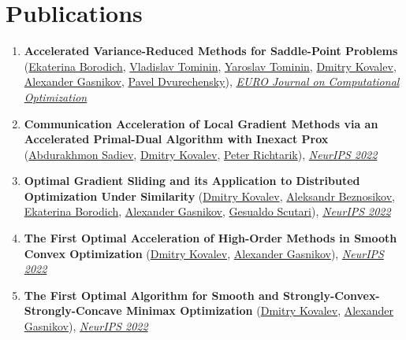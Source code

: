 \section{Publications}
\begin{enumerate}
\item \textbf{Accelerated Variance-Reduced Methods for Saddle-Point Problems} (\href{https://scholar.google.com/citations?user=9Dapoy8AAAAJ}{\color{linkcolour}Ekaterina Borodich}, \href{}{\color{linkcolour}Vladislav Tominin}, \href{}{\color{linkcolour}Yaroslav Tominin}, \href{https://www.dmitry-kovalev.com}{\color{linkcolour}Dmitry Kovalev}, \href{https://scholar.google.ru/citations?user=AmeE8qkAAAAJ}{\color{linkcolour}Alexander Gasnikov}, \href{http://wias-berlin.de/people/dvureche/}{\color{linkcolour}Pavel Dvurechensky}), \href{https://www.sciencedirect.com/science/article/pii/S2192440622000247}{\em \color{black}EURO Journal on Computational Optimization}
\item \textbf{Communication Acceleration of Local Gradient Methods via an Accelerated Primal-Dual Algorithm with Inexact Prox} (\href{https://scholar.google.com/citations?user=R-xZRIAAAAAJ&hl=ru}{\color{linkcolour}Abdurakhmon Sadiev}, \href{https://www.dmitry-kovalev.com}{\color{linkcolour}Dmitry Kovalev}, \href{https://richtarik.org}{\color{linkcolour}Peter Richtarik}), \href{https://nips.cc/Conferences/2022/Schedule?showEvent=52846}{\em \color{black}NeurIPS 2022}
\item \textbf{Optimal Gradient Sliding and its Application to Distributed Optimization Under Similarity} (\href{https://www.dmitry-kovalev.com}{\color{linkcolour}Dmitry Kovalev}, \href{https://anbeznosikov.github.io}{\color{linkcolour}Aleksandr Beznosikov}, \href{https://scholar.google.com/citations?user=9Dapoy8AAAAJ}{\color{linkcolour}Ekaterina Borodich}, \href{https://scholar.google.ru/citations?user=AmeE8qkAAAAJ}{\color{linkcolour}Alexander Gasnikov}, \href{https://engineering.purdue.edu/~gscutari/}{\color{linkcolour}Gesualdo Scutari}), \href{https://nips.cc/Conferences/2022/Schedule?showEvent=55134}{\em \color{black}NeurIPS 2022}
\item \textbf{The First Optimal Acceleration of High-Order Methods in Smooth Convex Optimization} (\href{https://www.dmitry-kovalev.com}{\color{linkcolour}Dmitry Kovalev}, \href{https://scholar.google.ru/citations?user=AmeE8qkAAAAJ}{\color{linkcolour}Alexander Gasnikov}), \href{https://nips.cc/Conferences/2022/Schedule?showEvent=53388}{\em \color{black}NeurIPS 2022}
\item \textbf{The First Optimal Algorithm for Smooth and Strongly-Convex-Strongly-Concave Minimax Optimization} (\href{https://www.dmitry-kovalev.com}{\color{linkcolour}Dmitry Kovalev}, \href{https://scholar.google.ru/citations?user=AmeE8qkAAAAJ}{\color{linkcolour}Alexander Gasnikov}), \href{https://nips.cc/Conferences/2022/Schedule?showEvent=53395}{\em \color{black}NeurIPS 2022}

\end{enumerate}
